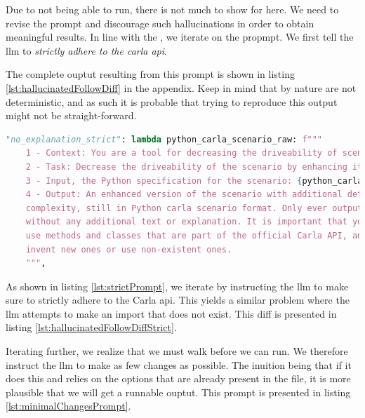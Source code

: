 Due to not being able to run, there is not much to show for here. We need to revise the prompt and
discourage such hallucinations in order to obtain meaningful results. In line with the
, we iterate on the propmpt. We first tell the \acrshort{llm} to
\emph{strictly adhere to the carla \acrshort{api}}.

The complete ouptut resulting from this prompt is shown in listing \ref{lst:hallucinatedFollowDiff}
in the appendix.
Keep in mind that  by nature are not deterministic, and as such it is probable
that trying to reproduce this output might not be straight-forward.

\begin{lstlisting}[language=python, label={lst:strictPrompt}, caption={A slightly more advanced prompt instructing the \acrshort{llm} to strictly adhere to the Carla \acrshort{api}.}]
        "no_explanation_strict": lambda python_carla_scenario_raw: f"""
    1 - Context: You are a tool for decreasing the driveability of scenarios in the driving simulator Carla.
    2 - Task: Decrease the driveability of the scenario by enhancing it with more details and complexity.
    3 - Input, the Python specification for the scenario: {python_carla_scenario_raw}
    4 - Output: An enhanced version of the scenario with additional details and
    complexity, still in Python carla scenario format. Only ever output the code,
    without any additional text or explanation. It is important that you only
    use methods and classes that are part of the official Carla API, and do not
    invent new ones or use non-existent ones.
    """,
\end{lstlisting}

As shown in listing \ref{lst:strictPrompt}, we iterate by instructing the \acrshort{llm} to make
sure to strictly adhere to the Carla \acrshort{api}. This yields a similar problem where the
\acrshort{llm} attempts to make an import that does not exist. This diff is presented in listing
\ref{lst:hallucinatedFollowDiffStrict}.

Iterating further, we realize that we must walk before we can run. We therefore instruct the
\acrshort{llm} to make as few changes as possible. The inuition being that if it does this and
relies on the options that are already present in the file, it is more plausible that we will get a
runnable ouptut. This prompt is presented in listing \ref{lst:minimalChangesPrompt}.

